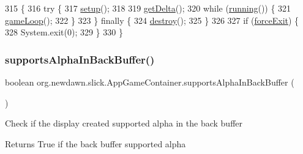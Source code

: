 \begin{DoxyCode}
315                                               \{
316         \textcolor{keywordflow}{try} \{
317             \mbox{\hyperlink{classorg_1_1newdawn_1_1slick_1_1_app_game_container_ac2c97110363892113b435cc8aa5b0d4a}{setup}}();
318             
319             \mbox{\hyperlink{classorg_1_1newdawn_1_1slick_1_1_game_container_a47af7100d91a7101cb71574dc70fb0dc}{getDelta}}();
320             \textcolor{keywordflow}{while} (\mbox{\hyperlink{classorg_1_1newdawn_1_1slick_1_1_game_container_a5cb10a093281abb5b6ee60f2b18c26c3}{running}}()) \{
321                 \mbox{\hyperlink{classorg_1_1newdawn_1_1slick_1_1_app_game_container_a57672732cfac93096300c549103619dd}{gameLoop}}();
322             \}
323         \} \textcolor{keywordflow}{finally} \{
324             \mbox{\hyperlink{classorg_1_1newdawn_1_1slick_1_1_app_game_container_a971f338748f899ab0034ba22e491fd60}{destroy}}();
325         \}
326         
327         \textcolor{keywordflow}{if} (\mbox{\hyperlink{classorg_1_1newdawn_1_1slick_1_1_game_container_afda255df5a0dc9c1a22e5a169c0176c5}{forceExit}}) \{
328             System.exit(0);
329         \}
330     \}
\end{DoxyCode}
\mbox{\label{classorg_1_1newdawn_1_1slick_1_1_app_game_container_a5a1e69d77e00826489cfeafd316e0e3e}} 
\subsubsection{\texorpdfstring{supports\+Alpha\+In\+Back\+Buffer()}{supportsAlphaInBackBuffer()}}
{\footnotesize\ttfamily boolean org.\+newdawn.\+slick.\+App\+Game\+Container.\+supports\+Alpha\+In\+Back\+Buffer (\begin{DoxyParamCaption}{ }\end{DoxyParamCaption})\hspace{0.3cm}{\ttfamily [inline]}}

Check if the display created supported alpha in the back buffer

\begin{DoxyReturn}{Returns}
True if the back buffer supported alpha 
\end{DoxyReturn}


